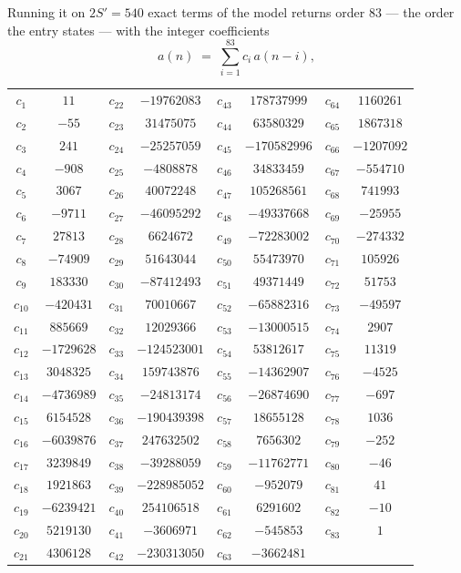 \documentclass[11pt,a4paper]{article}
\theoremstyle{plain}
\theoremstyle{definition}
\begin{document}
Running it on $2S'=540$ exact terms of the model returns order $83$ --- the order the
entry states --- with the integer coefficients
\[
a(n)\;=\;\sum_{i=1}^{83}c_i\,a(n-i),
\]
\begin{center}\small
\begin{tabular}{cccccccc}
$c_{1}$ & $11$ & $c_{22}$ & $-19762083$ & $c_{43}$ & $178737999$ & $c_{64}$ & $1160261$ \\
$c_{2}$ & $-55$ & $c_{23}$ & $31475075$ & $c_{44}$ & $63580329$ & $c_{65}$ & $1867318$ \\
$c_{3}$ & $241$ & $c_{24}$ & $-25257059$ & $c_{45}$ & $-170582996$ & $c_{66}$ & $-1207092$ \\
$c_{4}$ & $-908$ & $c_{25}$ & $-4808878$ & $c_{46}$ & $34833459$ & $c_{67}$ & $-554710$ \\
$c_{5}$ & $3067$ & $c_{26}$ & $40072248$ & $c_{47}$ & $105268561$ & $c_{68}$ & $741993$ \\
$c_{6}$ & $-9711$ & $c_{27}$ & $-46095292$ & $c_{48}$ & $-49337668$ & $c_{69}$ & $-25955$ \\
$c_{7}$ & $27813$ & $c_{28}$ & $6624672$ & $c_{49}$ & $-72283002$ & $c_{70}$ & $-274332$ \\
$c_{8}$ & $-74909$ & $c_{29}$ & $51643044$ & $c_{50}$ & $55473970$ & $c_{71}$ & $105926$ \\
$c_{9}$ & $183330$ & $c_{30}$ & $-87412493$ & $c_{51}$ & $49371449$ & $c_{72}$ & $51753$ \\
$c_{10}$ & $-420431$ & $c_{31}$ & $70010667$ & $c_{52}$ & $-65882316$ & $c_{73}$ & $-49597$ \\
$c_{11}$ & $885669$ & $c_{32}$ & $12029366$ & $c_{53}$ & $-13000515$ & $c_{74}$ & $2907$ \\
$c_{12}$ & $-1729628$ & $c_{33}$ & $-124523001$ & $c_{54}$ & $53812617$ & $c_{75}$ & $11319$ \\
$c_{13}$ & $3048325$ & $c_{34}$ & $159743876$ & $c_{55}$ & $-14362907$ & $c_{76}$ & $-4525$ \\
$c_{14}$ & $-4736989$ & $c_{35}$ & $-24813174$ & $c_{56}$ & $-26874690$ & $c_{77}$ & $-697$ \\
$c_{15}$ & $6154528$ & $c_{36}$ & $-190439398$ & $c_{57}$ & $18655128$ & $c_{78}$ & $1036$ \\
$c_{16}$ & $-6039876$ & $c_{37}$ & $247632502$ & $c_{58}$ & $7656302$ & $c_{79}$ & $-252$ \\
$c_{17}$ & $3239849$ & $c_{38}$ & $-39288059$ & $c_{59}$ & $-11762771$ & $c_{80}$ & $-46$ \\
$c_{18}$ & $1921863$ & $c_{39}$ & $-228985052$ & $c_{60}$ & $-952079$ & $c_{81}$ & $41$ \\
$c_{19}$ & $-6239421$ & $c_{40}$ & $254106518$ & $c_{61}$ & $6291602$ & $c_{82}$ & $-10$ \\
$c_{20}$ & $5219130$ & $c_{41}$ & $-3606971$ & $c_{62}$ & $-545853$ & $c_{83}$ & $1$ \\
$c_{21}$ & $4306128$ & $c_{42}$ & $-230313050$ & $c_{63}$ & $-3662481$ &  &  \\
\end{tabular}
\end{center}
\end{document}

